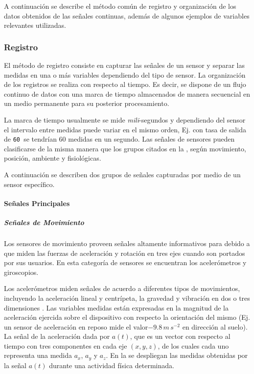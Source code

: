 A continuación se describe el método común de registro y organización
de los datos obtenidos de las señales continuas, además de algunos
ejemplos de variables relevantes utilizadas.

\subsubsection{Registro}

El método de registro consiste en capturar las señales de un sensor
y separar las medidas en una o más variables dependiendo del tipo
de sensor. La organización de los registros se realiza con respecto
al tiempo. Es decir, se dispone de un flujo continuo de datos con
una marca de tiempo almacenados de manera secuencial en un medio permanente
para su posterior procesamiento. 

La marca de tiempo usualmente se mide \emph{mili}-segundos y dependiendo
del sensor el intervalo entre medidas puede variar en el mismo orden,
Ej. con tasa de salida de \texttt{60  }se tendrían 60 medidas
en un segundo. Las señales de sensores pueden clasificarse de la misma
manera que los grupos citados en la , según
movimiento, posición, ambiente y fisiológicas. 

A continuación se describen dos grupos de señales capturadas por medio
de un sensor específico.

\paragraph{Señales Principales}

\subparagraph{Señales de Movimiento}

Los sensores de movimiento proveen señales altamente informativos
para  debido a que miden las fuerzas de aceleración y rotación
en tres ejes cuando son portados por sus usuarios. En esta categoría
de sensores se encuentran los acelerómetros y giroscopios. 

Los acelerómetros miden señales de acuerdo a diferentes tipos de movimientos,
incluyendo la aceleración lineal y centrípeta, la gravedad y vibración
en dos o tres dimensiones \cite{Goehl2007}. Las variables medidas
están expresadas en la magnitud de la aceleración ejercida sobre el
dispositivo con respecto la orientación del mismo (Ej. un sensor de
aceleración en reposo mide el valor$-9.8\,m\,s^{-2}$ en dirección
al suelo). La señal de la aceleración dada por $a(t)$, que es un
vector con respecto al tiempo con tres componentes en cada eje $(x,y,z)$,
de los cuales cada uno representa una medida $a_{x}$, $a_{y}$ y
$a_{z}$. En la  se despliegan las medidas
obtenidas por la señal $a(t)$ durante una actividad física determinada.

